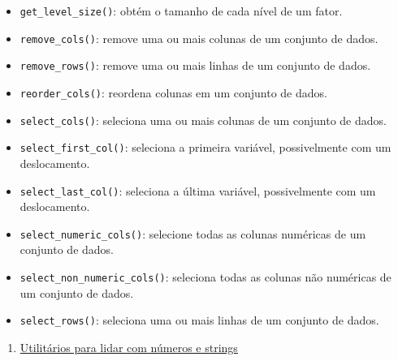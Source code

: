 \documentclass[
]{book}
\providecommand{\tightlist}{%
  \setlength{\itemsep}{0pt}\setlength{\parskip}{0pt}}
\begin{document}
\begin{itemize}
\item
  \texttt{get\_level\_size()}: obtém o tamanho de cada nível de um fator.
\item
  \texttt{remove\_cols()}: remove uma ou mais colunas de um conjunto de dados.
\item
  \texttt{remove\_rows()}: remove uma ou mais linhas de um conjunto de dados.
\item
  \texttt{reorder\_cols()}: reordena colunas em um conjunto de dados.
\item
  \texttt{select\_cols()}: seleciona uma ou mais colunas de um conjunto de dados.
\item
  \texttt{select\_first\_col()}: seleciona a primeira variável, possivelmente com um deslocamento.
\item
  \texttt{select\_last\_col()}: seleciona a última variável, possivelmente com um deslocamento.
\item
  \texttt{select\_numeric\_cols()}: selecione todas as colunas numéricas de um conjunto de dados.
\item
  \texttt{select\_non\_numeric\_cols()}: seleciona todas as colunas não numéricas de um conjunto de dados.
\item
  \texttt{select\_rows()}: seleciona uma ou mais linhas de um conjunto de dados.
\end{itemize}

\begin{enumerate}
\def\labelenumi{\arabic{enumi}.}
\setcounter{enumi}{1}
\tightlist
\item
  \href{https://tiagoolivoto.github.io/metan/reference/utils_num_str.html}{Utilitários para lidar com números e strings}
\end{enumerate}
\end{document}
